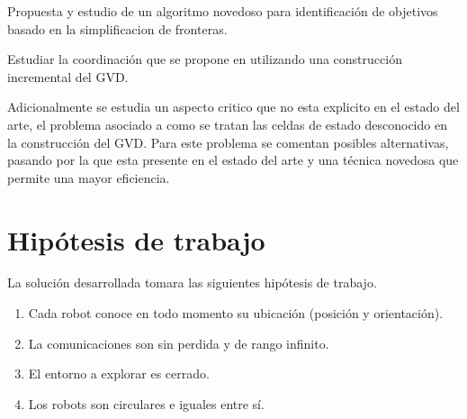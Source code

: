 Propuesta y estudio de un algoritmo novedoso para identificación de objetivos basado en la simplificacion de fronteras.%

Estudiar la coordinación que se propone en \cite{wurm2008coordinated} utilizando una construcción incremental del GVD.


Adicionalmente se estudia un aspecto critico que no esta explicito en el estado del arte, el problema asociado a como se tratan las celdas de estado desconocido en la construcción del GVD. Para este problema se comentan posibles alternativas, pasando por la que esta presente en el estado del arte y una técnica novedosa que permite una mayor eficiencia.


\section{Hipótesis de trabajo}
La solución desarrollada tomara las siguientes hipótesis de trabajo.
\begin{enumerate}[label=(\roman*)]
  \item Cada robot conoce en todo momento su ubicación (posición y orientación).
  \item La comunicaciones son sin perdida y de rango infinito.
  \item El entorno a explorar es cerrado.
  \item Los robots son circulares e iguales entre sí.
\end{enumerate}

